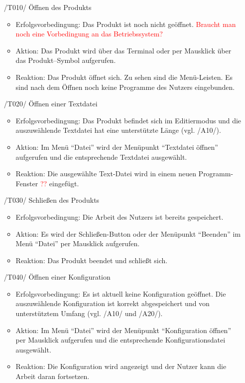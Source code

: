 \documentclass[parskip=full]{scrartcl}
\newcommand\frage[1]{\textcolor{red}{#1}}
\begin{document}
\begin{itemize}
	\item[/T010/] Öffnen des Produkts
	\begin{itemize}
		\item Erfolgsvorbedingung: Das Produkt ist noch nicht geöffnet.
		\frage{Braucht man noch eine Vorbedingung an das Betriebssystem?}
		\item Aktion: Das Produkt wird über das Terminal oder per Mausklick über das Produkt--Symbol aufgerufen.
		\item Reaktion: Das Produkt öffnet sich. Zu sehen sind die Menü-Leisten. Es sind nach dem Öffnen noch keine Programme des Nutzers eingebunden.
	\end{itemize}
	
	\item[/T020/] Öffnen einer Textdatei
	\begin{itemize}
		\item Erfolgsvorbedingung: Das Produkt befindet sich im \gls{Editiermodus} und die auszuwählende Textdatei hat eine unterstützte Länge (vgl. /A10/).
		\item Aktion: Im Menü \enquote{Datei} wird der Menüpunkt \enquote{Textdatei öffnen} aufgerufen und die entsprechende Textdatei ausgewählt.
		\item Reaktion: Die ausgewählte Text-Datei wird in einem neuen Programm-Fenster \frage{??} eingefügt.
	\end{itemize}	

	\item[/T030/] Schließen des Produkts
	\begin{itemize}
		\item Erfolgsvorbedingung: Die Arbeit des Nutzers ist bereits gespeichert.
		\item Aktion: Es wird der Schließen-Button  oder der Menüpunkt \enquote{Beenden} im Menü \enquote{Datei} per Mausklick aufgerufen.
		\item Reaktion: Das Produkt beendet und schließt sich.
		\end{itemize}	
	
	\item[/T040/] Öffnen einer Konfiguration
		\begin{itemize}
		\item Erfolgsvorbedingung: Es ist aktuell keine Konfiguration geöffnet. Die auszuwählende Konfiguration ist korrekt abgespeichert und von unterstütztem Umfang (vgl. /A10/ und /A20/).
		\item Aktion: Im Menü \enquote{Datei} wird der Menüpunkt \enquote{Konfiguration öffnen} per Mausklick aufgerufen und die entsprechende \gls{Konfigurationsdatei} ausgewählt.
		\item Reaktion: Die Konfiguration wird angezeigt und der Nutzer kann die Arbeit daran fortsetzen.		
		\end{itemize}	
	

\end{itemize}
\end{document}
